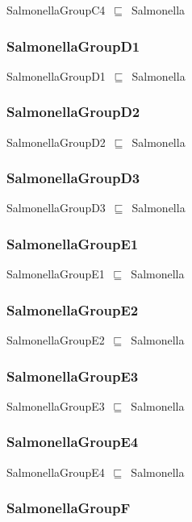 \documentclass{article}
\begin{document}
SalmonellaGroupC4~\ensuremath{\sqsubseteq}~Salmonella~

\subsubsection*{SalmonellaGroupD1}

SalmonellaGroupD1~\ensuremath{\sqsubseteq}~Salmonella~

\subsubsection*{SalmonellaGroupD2}

SalmonellaGroupD2~\ensuremath{\sqsubseteq}~Salmonella~

\subsubsection*{SalmonellaGroupD3}

SalmonellaGroupD3~\ensuremath{\sqsubseteq}~Salmonella~

\subsubsection*{SalmonellaGroupE1}

SalmonellaGroupE1~\ensuremath{\sqsubseteq}~Salmonella~

\subsubsection*{SalmonellaGroupE2}

SalmonellaGroupE2~\ensuremath{\sqsubseteq}~Salmonella~

\subsubsection*{SalmonellaGroupE3}

SalmonellaGroupE3~\ensuremath{\sqsubseteq}~Salmonella~

\subsubsection*{SalmonellaGroupE4}

SalmonellaGroupE4~\ensuremath{\sqsubseteq}~Salmonella~

\subsubsection*{SalmonellaGroupF}
\end{document}
